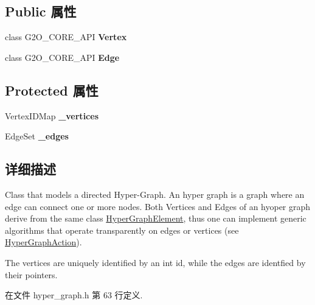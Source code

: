 \subsection*{Public 属性}
\begin{DoxyCompactItemize}
\item 
\hypertarget{classg2o_1_1HyperGraph_a2aca385a3acb87b4f4365765afd10093}{class G2\-O\-\_\-\-C\-O\-R\-E\-\_\-\-A\-P\-I {\bfseries Vertex}}\label{classg2o_1_1HyperGraph_a2aca385a3acb87b4f4365765afd10093}

\item 
\hypertarget{classg2o_1_1HyperGraph_a59ab1fe84b0728a65a0ba15fce9b9cf7}{class G2\-O\-\_\-\-C\-O\-R\-E\-\_\-\-A\-P\-I {\bfseries Edge}}\label{classg2o_1_1HyperGraph_a59ab1fe84b0728a65a0ba15fce9b9cf7}

\end{DoxyCompactItemize}
\subsection*{Protected 属性}
\begin{DoxyCompactItemize}
\item 
\hypertarget{classg2o_1_1HyperGraph_a83132c77c8d0896581d168cbc72f673a}{Vertex\-I\-D\-Map {\bfseries \-\_\-vertices}}\label{classg2o_1_1HyperGraph_a83132c77c8d0896581d168cbc72f673a}

\item 
\hypertarget{classg2o_1_1HyperGraph_afe4ae6e9ef05c8bded2b1b30e1886b36}{Edge\-Set {\bfseries \-\_\-edges}}\label{classg2o_1_1HyperGraph_afe4ae6e9ef05c8bded2b1b30e1886b36}

\end{DoxyCompactItemize}


\subsection{详细描述}
Class that models a directed Hyper-\/\-Graph. An hyper graph is a graph where an edge can connect one or more nodes. Both Vertices and Edges of an hyoper graph derive from the same class \hyperlink{structg2o_1_1HyperGraph_1_1HyperGraphElement}{Hyper\-Graph\-Element}, thus one can implement generic algorithms that operate transparently on edges or vertices (see \hyperlink{classg2o_1_1HyperGraphAction}{Hyper\-Graph\-Action}).

The vertices are uniquely identified by an int id, while the edges are identfied by their pointers. 

在文件 hyper\-\_\-graph.\-h 第 63 行定义.



